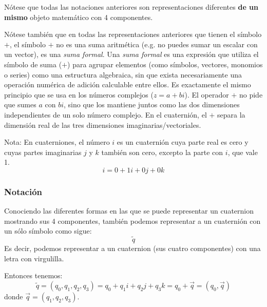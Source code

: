 Nótese que todas las notaciones anteriores son representaciones diferentes \textbf{de un mismo} objeto matemático con 4 componentes.

Nótese también que en todas las representaciones anteriores que tienen el símbolo $+$, el símbolo $+$ no es una suma aritmética (e.g. no puedes sumar un escalar con un vector), es una \textit{suma formal}. Una \textit{suma formal} es una expresión que utiliza el símbolo de suma ($+$) para agrupar elementos (como símbolos, vectores, monomios o series) como una estructura algebraica, sin que exista necesariamente una operación numérica de adición calculable entre ellos. Es exactamente el mismo principio que se usa en los números complejos ($z = a + bi$). El operador $+$ no pide que sumes $a$ con $bi$, sino que los mantiene juntos como las dos dimensiones independientes de un solo número complejo. En el cuaternión, el $+$ separa la dimensión real de las tres dimensiones imaginarias/vectoriales.

Nota: En cuaterniones, el número $i$ es un cuaternión cuya parte real es cero y cuyas partes imaginarias $j$ y $k$ también son cero, excepto la parte con $i$, que vale 1.
\begin{equation*}
    i=0+1i+0j+0k
\end{equation*}

\subsubsection{Notación}
Conociendo las diferentes formas en las que se puede representar un cuaternion mostrando sus 4 componentes, también podemos representar a un cuaternión con un sólo símbolo como sigue:
\begin{equation}
    \tilde{q}
\end{equation}
Es decir, podemos representar a un cuaternion (sus cuatro componentes) con una letra con virgulilla.

Entonces tenemos:
\begin{equation}
    \tilde{q}=(q_0, q_1, q_2, q_3)=q_0+q_1i+q_2j+q_3k=q_0+\vec{q}=(q_0,\vec{q})
\end{equation}
donde $\vec{q}=(q_1,q_2,q_3)$.





